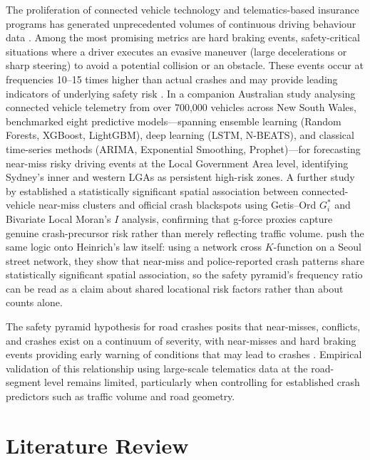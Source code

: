 \documentclass[letterpaper,8pt]{extarticle}  %
\begin{document}
\begin{doublespacing}
\begin{linenumbers}
The proliferation of connected vehicle technology and telematics-based insurance programs has generated unprecedented volumes of continuous driving behaviour data \cite{Ayuso2019TelematicsWomens}. Among the most promising metrics are hard braking events, safety-critical situations where a driver executes an evasive maneuver (large decelerations or sharp steering) to avoid a potential collision or an obstacle. These events occur at frequencies 10--15 times higher than actual crashes and may provide leading indicators of underlying safety risk \cite{Arumi2024CanEvents}. In a companion Australian study analysing connected vehicle telemetry from over 700{,}000 vehicles across New South Wales, \citet{Mihaita2026Proactive} benchmarked eight predictive models---spanning ensemble learning (Random Forests, XGBoost, LightGBM), deep learning (LSTM, N-BEATS), and classical time-series methods (ARIMA, Exponential Smoothing, Prophet)---for forecasting near-miss risky driving events at the Local Government Area level, identifying Sydney's inner and western LGAs as persistent high-risk zones. A further study by \citet{Grigorev2025Spatial} established a statistically significant spatial association between connected-vehicle near-miss clusters and official crash blackspots using Getis--Ord $G_i^{\ast}$ and Bivariate Local Moran's $I$ analysis, confirming that g-force proxies capture genuine crash-precursor risk rather than merely reflecting traffic volume. \citet{Park2023Heinrich} push the same logic onto Heinrich's law itself: using a network cross $K$-function on a Seoul street network, they show that near-miss and police-reported crash patterns share statistically significant spatial association, so the safety pyramid's frequency ratio can be read as a claim about shared locational risk factors rather than about counts alone.

The safety pyramid hypothesis for road crashes posits that near-misses, conflicts, and crashes exist on a continuum of severity, with near-misses and hard braking events providing early warning of conditions that may lead to crashes \cite{Hyden1987TheTechnique}. Empirical validation of this relationship using large-scale telematics data at the road-segment level remains limited, particularly when controlling for established crash predictors such as traffic volume and road geometry.



\section{Literature Review}\label{sec:litreview}

\end{linenumbers}
\end{doublespacing}
\end{document}
